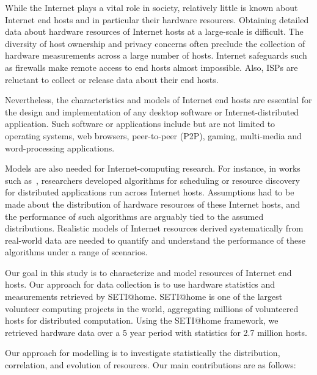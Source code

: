 \documentclass[conference]{IEEEtran}
\begin{document}
While the Internet plays a vital role in society, relatively
little is known about Internet end hosts and in particular
their hardware resources.  Obtaining detailed data about
hardware resources of Internet hosts at a large-scale is
difficult.  The diversity of host ownership and privacy
concerns often preclude the collection of hardware
measurements across a large number of hosts.  Internet
safeguards such as firewalls make remote access to end hosts
almost impossible.  Also, ISPs are reluctant to collect or
release data about their end hosts.

Nevertheless, the characteristics and models of Internet end
hosts are essential for the design and implementation of any
desktop software or Internet-distributed application.  Such
software or applications include but are not limited to
operating systems, web browsers, peer-to-peer (P2P),
gaming, multi-media and word-processing applications.

Models are also needed for Internet-computing research.  For
instance, in works such as~\cite{issam_jpdc10, massimo_pcgrid08, lo_wave},
researchers developed algorithms for scheduling
or resource discovery for distributed applications run
across Internet hosts.  Assumptions had to be made about the
distribution of hardware resources of these Internet hosts,
and the performance of such algorithms are arguably tied to
the assumed distributions.  Realistic models of Internet
resources derived systematically from real-world data are
needed to quantify and understand the performance of these
algorithms under a range of scenarios.





Our goal in this study is to characterize and model
resources of Internet end hosts.  Our approach for data
collection is to use hardware statistics and measurements
retrieved by SETI@home.  SETI@home is one of the largest
volunteer computing projects in the world, aggregating
millions of volunteered hosts for distributed computation.
Using the SETI@home framework, we retrieved hardware data
over a 5 year period with statistics for 2.7 million hosts.

Our approach for modelling is to investigate statistically
the distribution, correlation, and evolution of resources.
Our main contributions are as follows:
\end{document}
